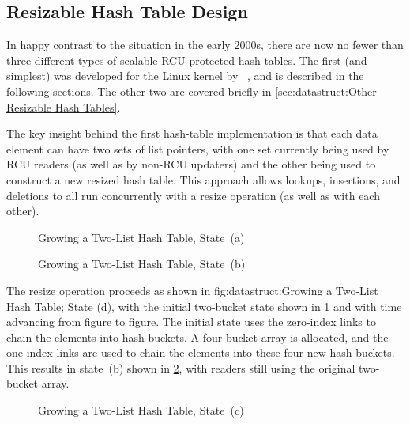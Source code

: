 \subsection{Resizable Hash Table Design}
\label{sec:datastruct:Resizable Hash Table Design}

In happy contrast to the situation in the early 2000s, there are now
no fewer than three different types of scalable RCU-protected hash
tables.
The first (and simplest) was developed for the Linux kernel by
~\cite{HerbertXu2010RCUResizeHash}, and is described in the
following sections.
The other two are covered briefly in
\cref{sec:datastruct:Other Resizable Hash Tables}.

The key insight behind the first hash-table implementation is that
each data element can have two sets of list pointers, with one set
currently being used by RCU readers (as well as by non-RCU updaters)
and the other being used to construct a new resized hash table.
This approach allows lookups, insertions, and deletions to all run
concurrently with a resize operation (as well as with each other).

\begin{figure}
\centering
{}
\caption{Growing a Two-List Hash Table, State~(a)}
\label{fig:datastruct:Growing a Two-List Hash Table; State (a)}
\end{figure}

\begin{figure}
\centering
{}
\caption{Growing a Two-List Hash Table, State~(b)}
\label{fig:datastruct:Growing a Two-List Hash Table; State (b)}
\end{figure}

The resize operation proceeds as shown in
{fig:datastruct:Growing a Two-List Hash Table; State (d)},
with the initial two-bucket state shown in
\cref{fig:datastruct:Growing a Two-List Hash Table; State (a)}
and with time advancing from figure to figure.
The initial state uses the zero-index links to chain the elements into
hash buckets.
A four-bucket array is allocated, and the one-index links are used to
chain the elements into these four new hash buckets.
This results in state~(b) shown in
\cref{fig:datastruct:Growing a Two-List Hash Table; State (b)},
with readers still using the original two-bucket array.

\begin{figure}
\centering
{}
\caption{Growing a Two-List Hash Table, State~(c)}
\label{fig:datastruct:Growing a Two-List Hash Table; State (c)}
\end{figure}

